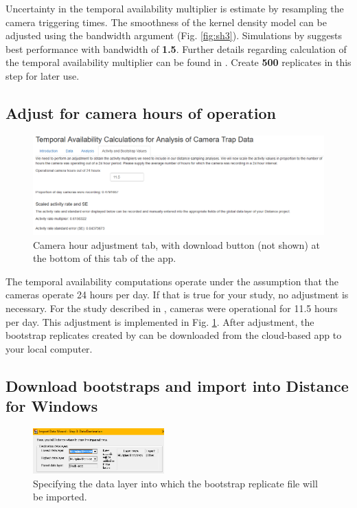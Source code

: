 \documentclass[a4paper, 10pt]{article}
\begin{document}
Uncertainty in the temporal availability multiplier is estimate by resampling the camera triggering times.  The smoothness of the kernel density model can be adjusted using the bandwidth argument (Fig. \ref{fig:sh3}).  Simulations by \citet{rowcliffe_2014} suggests best performance with bandwidth of \textbf{1.5}.  Further details regarding calculation of the temporal availability multiplier can be found in \citet{activity_pkg}.  Create \textbf{500} replicates in this step for later use.


\subsection{Adjust for camera hours of operation}

\begin{figure}[H]
\includegraphics[width=\textwidth, frame]{images/shiny-tab4.png}
\caption{Camera hour adjustment tab, with download button (not shown) at the bottom of this tab of the app. \label{fig:sh4}}
\end{figure}

The temporal availability computations operate under the assumption that the cameras operate 24 hours per day.  If that is true for your study, no adjustment is necessary.  For the study described in \citet{howeetal}, cameras were operational for 11.5 hours per day.  This adjustment is implemented in Fig. \ref{fig:sh4}.  After adjustment, the bootstrap replicates created by \citet{activity_pkg} can be downloaded from the cloud-based app to your local computer.

\subsection{Download bootstraps and import into Distance for Windows}
\begin{figure}
\includegraphics[width=0.45\textwidth, frame]{images/import-layer.png}
\caption{Specifying the data layer into which the bootstrap replicate file will be imported. \label{fig:i-layer}}
\vspace{-25pt}
\end{figure}
\end{document}
